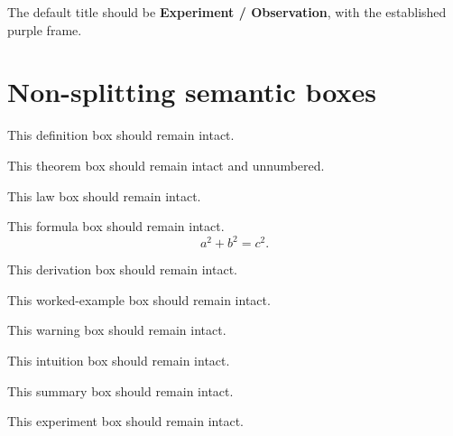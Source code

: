 \documentclass{otscience}
\begin{document}
\begin{experimentbox}
    The default title should be \textbf{Experiment / Observation}, with
    the established purple frame.
\end{experimentbox}

\section{Non-splitting semantic boxes}

\begin{definitionboxnosplit}
    This definition box should remain intact.
\end{definitionboxnosplit}

\begin{theoremboxnosplit}
    This theorem box should remain intact and unnumbered.
\end{theoremboxnosplit}

\begin{lawboxnosplit}
    This law box should remain intact.
\end{lawboxnosplit}

\begin{formulaboxnosplit}
    This formula box should remain intact.
    \[
        a^2+b^2=c^2.
    \]
\end{formulaboxnosplit}

\begin{derivationboxnosplit}
    This derivation box should remain intact.
\end{derivationboxnosplit}

\begin{exampleboxnosplit}
    This worked-example box should remain intact.
\end{exampleboxnosplit}

\begin{warningboxnosplit}
    This warning box should remain intact.
\end{warningboxnosplit}

\begin{intuitionboxnosplit}
    This intuition box should remain intact.
\end{intuitionboxnosplit}

\begin{summaryboxnosplit}
    This summary box should remain intact.
\end{summaryboxnosplit}

\begin{experimentboxnosplit}
    This experiment box should remain intact.
\end{experimentboxnosplit}
\end{document}
